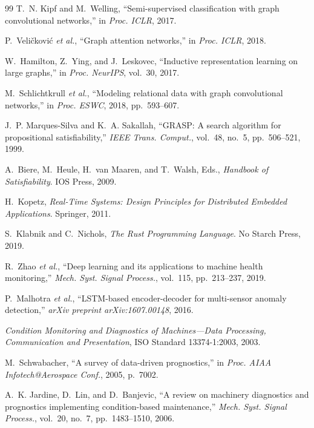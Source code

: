 \documentclass[journal]{IEEEtran}
\begin{document}
\begin{thebibliography}{99}
T.~N. Kipf and M.~Welling, ``Semi-supervised classification with graph convolutional networks,'' in \textit{Proc. ICLR}, 2017.

P.~Veli\v{c}kovi\'c \textit{et al.}, ``Graph attention networks,'' in \textit{Proc. ICLR}, 2018.

W.~Hamilton, Z.~Ying, and J.~Leskovec, ``Inductive representation learning on large graphs,'' in \textit{Proc. NeurIPS}, vol.~30, 2017.

M.~Schlichtkrull \textit{et al.}, ``Modeling relational data with graph convolutional networks,'' in \textit{Proc. ESWC}, 2018, pp.~593--607.

J.~P. Marques-Silva and K.~A. Sakallah, ``GRASP: A search algorithm for propositional satisfiability,'' \textit{IEEE Trans. Comput.}, vol.~48, no.~5, pp.~506--521, 1999.

A.~Biere, M.~Heule, H.~van Maaren, and T.~Walsh, Eds., \textit{Handbook of Satisfiability}. IOS Press, 2009.

H.~Kopetz, \textit{Real-Time Systems: Design Principles for Distributed Embedded Applications}. Springer, 2011.

S.~Klabnik and C.~Nichols, \textit{The Rust Programming Language}. No Starch Press, 2019.

R.~Zhao \textit{et al.}, ``Deep learning and its applications to machine health monitoring,'' \textit{Mech. Syst. Signal Process.}, vol.~115, pp.~213--237, 2019.

P.~Malhotra \textit{et al.}, ``LSTM-based encoder-decoder for multi-sensor anomaly detection,'' \textit{arXiv preprint arXiv:1607.00148}, 2016.

\textit{Condition Monitoring and Diagnostics of Machines---Data Processing, Communication and Presentation}, ISO Standard 13374-1:2003, 2003.

M.~Schwabacher, ``A survey of data-driven prognostics,'' in \textit{Proc. AIAA Infotech@Aerospace Conf.}, 2005, p.~7002.

A.~K. Jardine, D.~Lin, and D.~Banjevic, ``A review on machinery diagnostics and prognostics implementing condition-based maintenance,'' \textit{Mech. Syst. Signal Process.}, vol.~20, no.~7, pp.~1483--1510, 2006.


\end{thebibliography}
\end{document}

